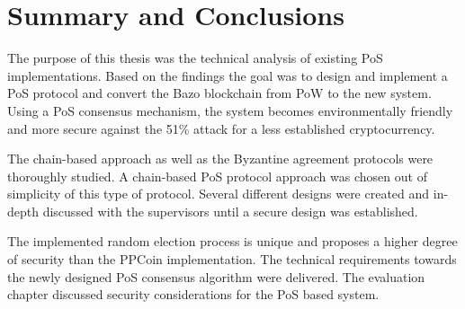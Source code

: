 \chapter{Summary and Conclusions}

The purpose of this thesis was the technical analysis of existing PoS implementations. Based on the findings the goal was to design and implement a PoS protocol and convert the Bazo blockchain from PoW to the new system. Using a PoS consensus mechanism, the system becomes environmentally friendly and more secure against the 51\% attack for a less established cryptocurrency. 

The chain-based approach as well as the Byzantine agreement protocols were thoroughly studied. A chain-based PoS protocol approach was chosen out of simplicity of this type of protocol. Several different designs were created and in-depth discussed with the supervisors until a secure design was established. 

The implemented random election process is unique and proposes a higher degree of security than the PPCoin implementation. The technical requirements towards the newly designed PoS consensus algorithm were delivered. The evaluation chapter discussed security considerations for the PoS based system.